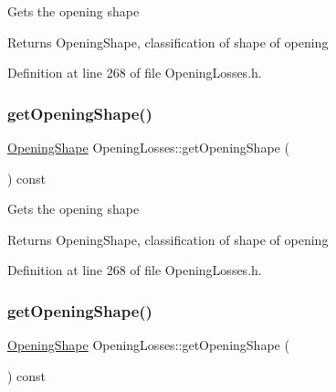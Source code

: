 Gets the opening shape \begin{DoxyReturn}{Returns}
Opening\+Shape, classification of shape of opening 
\end{DoxyReturn}


Definition at line 268 of file Opening\+Losses.\+h.

\mbox{\label{class_opening_losses_a5046cd699178e4edca774d0d0da7965a}} 
\subsubsection{\texorpdfstring{get\+Opening\+Shape()}{getOpeningShape()}\hspace{0.1cm}{\footnotesize\ttfamily [2/3]}}
{\footnotesize\ttfamily \hyperlink{class_opening_losses_a57f9759b6fd72a1b75aa885800e26157}{Opening\+Shape} Opening\+Losses\+::get\+Opening\+Shape (\begin{DoxyParamCaption}{ }\end{DoxyParamCaption}) const\hspace{0.3cm}{\ttfamily [inline]}}

Gets the opening shape \begin{DoxyReturn}{Returns}
Opening\+Shape, classification of shape of opening 
\end{DoxyReturn}


Definition at line 268 of file Opening\+Losses.\+h.

\mbox{\label{class_opening_losses_a5046cd699178e4edca774d0d0da7965a}} 
\subsubsection{\texorpdfstring{get\+Opening\+Shape()}{getOpeningShape()}\hspace{0.1cm}{\footnotesize\ttfamily [3/3]}}
{\footnotesize\ttfamily \hyperlink{class_opening_losses_a57f9759b6fd72a1b75aa885800e26157}{Opening\+Shape} Opening\+Losses\+::get\+Opening\+Shape (\begin{DoxyParamCaption}{ }\end{DoxyParamCaption}) const\hspace{0.3cm}{\ttfamily [inline]}}

